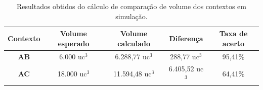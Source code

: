 \begin{table}[H]
    \centering
    \caption{Resultados obtidos do cálculo de comparação de volume dos contextos em simulação.}
    \begin{tabular}{ccccc}
        \toprule
        \textbf{Contexto} & \textbf{Volume esperado} & \textbf{Volume calculado} & \textbf{Diferença} & \textbf{Taxa de acerto} \\ \midrule
        \textbf{AB} & 6.000 uc$^3$ & 6.288,77 uc$^3$ & 288,77 uc$^3$ & 95,41\% \\
        \textbf{AC} & 18.000 uc$^3$ & 11.594,48 uc$^3$ & 6.405,52 uc$^3$ & 64,41\% \\ \bottomrule
    \end{tabular}
    \label{tab:tabela_resultados_contextos_sim}
\end{table}

